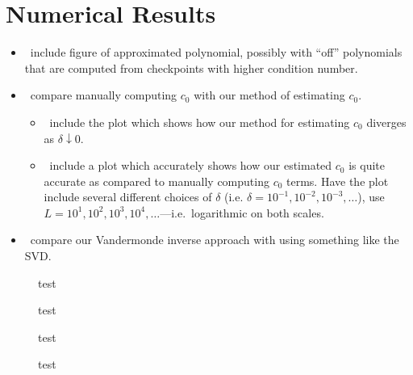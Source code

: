 \section{Numerical Results}

\begin{itemize}
\item \TODO\ include figure of approximated polynomial, possibly with
  ``off'' polynomials that are computed from checkpoints with higher
  condition number.
\item \TODO\ compare manually computing $c_0$ with our method of
  estimating $c_0$.
  \begin{itemize}
  \item \TODO\ include the plot which shows how our method for
    estimating $c_0$ diverges as $\delta \downarrow 0$.
  \item \TODO\ include a plot which accurately shows how our estimated
    $c_0$ is quite accurate as compared to manually computing $c_0$
    terms. Have the plot include several different choices of $\delta$
    (i.e. $\delta = 10^{-1}, 10^{-2}, 10^{-3}, \hdots$), use
    $L = 10^1, 10^2, 10^3, 10^4, \hdots$---i.e.\ logarithmic on both
    scales.
  \end{itemize}
\item \TODO\ compare our Vandermonde inverse approach with using
  something like the SVD.\@
\end{itemize}

%   

\begin{figure}[h]
  \centering
  
  \caption{test}\label{fig:linf-error}
\end{figure}

\begin{figure}[h]
  \centering
  
  \caption{test}\label{fig:timings}
\end{figure}

\begin{figure}[h]
  \centering
  
  \caption{test}\label{fig:optL}
\end{figure}

\begin{figure}[h]
  \centering
  
  \caption{test}\label{fig:raddiff}
\end{figure}


